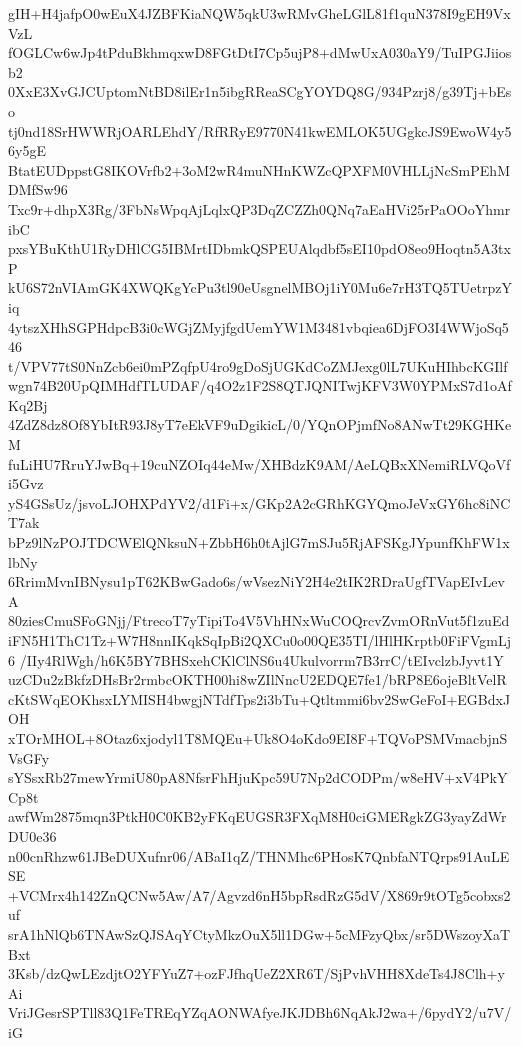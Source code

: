 gIH+H4jafpO0wEuX4JZBFKiaNQW5qkU3wRMvGheLGlL81f1quN378I9gEH9VxVzL
fOGLCw6wJp4tPduBkhmqxwD8FGtDtI7Cp5ujP8+dMwUxA030aY9/TuIPGJiiosb2
0XxE3XvGJCUptomNtBD8ilEr1n5ibgRReaSCgYOYDQ8G/934Pzrj8/g39Tj+bEso
tj0nd18SrHWWRjOARLEhdY/RfRRyE9770N41kwEMLOK5UGgkcJS9EwoW4y56y5gE
BtatEUDppstG8IKOVrfb2+3oM2wR4muNHnKWZcQPXFM0VHLLjNcSmPEhMDMfSw96
Txc9r+dhpX3Rg/3FbNsWpqAjLqlxQP3DqZCZZh0QNq7aEaHVi25rPaOOoYhmribC
pxsYBuKthU1RyDHlCG5IBMrtIDbmkQSPEUAlqdbf5sEI10pdO8eo9Hoqtn5A3txP
kU6S72nVIAmGK4XWQKgYcPu3tl90eUsgnelMBOj1iY0Mu6e7rH3TQ5TUetrpzYiq
4ytszXHhSGPHdpcB3i0cWGjZMyjfgdUemYW1M3481vbqiea6DjFO3I4WWjoSq546
t/VPV77tS0NnZcb6ei0mPZqfpU4ro9gDoSjUGKdCoZMJexg0lL7UKuHIhbcKGIlf
wgn74B20UpQIMHdfTLUDAF/q4O2z1F2S8QTJQNITwjKFV3W0YPMxS7d1oAfKq2Bj
4ZdZ8dz8Of8YbItR93J8yT7eEkVF9uDgikicL/0/YQnOPjmfNo8ANwTt29KGHKeM
fuLiHU7RruYJwBq+19cuNZOIq44eMw/XHBdzK9AM/AeLQBxXNemiRLVQoVfi5Gvz
yS4GSsUz/jsvoLJOHXPdYV2/d1Fi+x/GKp2A2cGRhKGYQmoJeVxGY6hc8iNCT7ak
bPz9lNzPOJTDCWElQNksuN+ZbbH6h0tAjlG7mSJu5RjAFSKgJYpunfKhFW1xlbNy
6RrimMvnIBNysu1pT62KBwGado6s/wVsezNiY2H4e2tIK2RDraUgfTVapEIvLevA
80ziesCmuSFoGNjj/FtrecoT7yTipiTo4V5VhHNxWuCOQrcvZvmORnVut5f1zuEd
iFN5H1ThC1Tz+W7H8nnIKqkSqIpBi2QXCu0o00QE35TI/lHlHKrptb0FiFVgmLj6
/IIy4RlWgh/h6K5BY7BHSxehCKlClNS6u4Ukulvorrm7B3rrC/tEIvclzbJyvt1Y
uzCDu2zBkfzDHsBr2rmbcOKTH00hi8wZIlNncU2EDQE7fe1/bRP8E6ojeBltVelR
cKtSWqEOKhsxLYMISH4bwgjNTdfTps2i3bTu+Qtltmmi6bv2SwGeFoI+EGBdxJOH
xTOrMHOL+8Otaz6xjodyl1T8MQEu+Uk8O4oKdo9EI8F+TQVoPSMVmacbjnSVsGFy
sYSsxRb27mewYrmiU80pA8NfsrFhHjuKpc59U7Np2dCODPm/w8eHV+xV4PkYCp8t
awfWm2875mqn3PtkH0C0KB2yFKqEUGSR3FXqM8H0ciGMERgkZG3yayZdWrDU0e36
n00cnRhzw61JBeDUXufnr06/ABaI1qZ/THNMhc6PHosK7QnbfaNTQrps91AuLESE
+VCMrx4h142ZnQCNw5Aw/A7/Agvzd6nH5bpRsdRzG5dV/X869r9tOTg5cobxs2uf
srA1hNlQb6TNAwSzQJSAqYCtyMkzOuX5ll1DGw+5cMFzyQbx/sr5DWszoyXaTBxt
3Ksb/dzQwLEzdjtO2YFYuZ7+ozFJfhqUeZ2XR6T/SjPvhVHH8XdeTs4J8Clh+yAi
VriJGesrSPTll83Q1FeTREqYZqAONWAfyeJKJDBh6NqAkJ2wa+/6pydY2/u7V/iG
